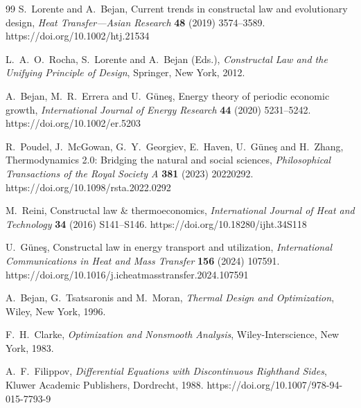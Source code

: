 \documentclass[12pt]{article}
\theoremstyle{plain}
\theoremstyle{definition}
\theoremstyle{remark}
\begin{document}
\begin{thebibliography}{99}
S.~Lorente and A.~Bejan,
Current trends in constructal law and evolutionary design,
\emph{Heat Transfer---Asian Research}
\textbf{48} (2019) 3574--3589.
https://doi.org/10.1002/htj.21534

L.~A.~O.~Rocha, S.~Lorente and A.~Bejan (Eds.),
\emph{Constructal Law and the Unifying Principle of Design},
Springer, New York, 2012.


A.~Bejan, M.~R.~Errera and U.~G\"une\c{s},
Energy theory of periodic economic growth,
\emph{International Journal of Energy Research}
\textbf{44} (2020) 5231--5242.
https://doi.org/10.1002/er.5203

R.~Poudel, J.~McGowan, G.~Y.~Georgiev, E.~Haven, U.~G\"une\c{s} and H.~Zhang,
Thermodynamics 2.0: Bridging the natural and social sciences,
\emph{Philosophical Transactions of the Royal Society A}
\textbf{381} (2023) 20220292.
https://doi.org/10.1098/rsta.2022.0292

M.~Reini,
Constructal law \& thermoeconomics,
\emph{International Journal of Heat and Technology}
\textbf{34} (2016) S141--S146.
https://doi.org/10.18280/ijht.34S118

U.~G\"une\c{s},
Constructal law in energy transport and utilization,
\emph{International Communications in Heat and Mass Transfer}
\textbf{156} (2024) 107591.
https://doi.org/10.1016/j.icheatmasstransfer.2024.107591


A.~Bejan, G.~Tsatsaronis and M.~Moran,
\emph{Thermal Design and Optimization},
Wiley, New York, 1996.


F.~H.~Clarke,
\emph{Optimization and Nonsmooth Analysis},
Wiley-Interscience, New York, 1983.

A.~F.~Filippov,
\emph{Differential Equations with Discontinuous Righthand Sides},
Kluwer Academic Publishers, Dordrecht, 1988.
https://doi.org/10.1007/978-94-015-7793-9


\end{thebibliography}
\end{document}

